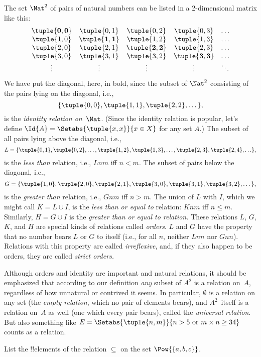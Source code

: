 \documentclass[../../../include/open-logic-section]{subfiles}
\begin{document}
\begin{ex}
The set $\Nat^{2}$ of
pairs of natural numbers can be listed in a 2-dimensional matrix like
this:
\[
\begin{array}{ccccc}
\mathbf{\tuple{ 0,0 }} & \tuple{ 0,1 } &
  \tuple{ 0,2 } & \tuple{ 0,3 } & \ldots\\
\tuple{ 1,0 } & \mathbf{\tuple{ 1,1 }} &
  \tuple{ 1,2 } & \tuple{ 1,3 } & \ldots\\
\tuple{ 2,0 } & \tuple{ 2,1 } &
  \mathbf{\tuple{ 2,2 }} & \tuple{ 2,3 } & \ldots\\
\tuple{ 3,0 } & \tuple{ 3,1 } & \tuple{ 3,2 } &
  \mathbf{\tuple{ 3,3 }} & \ldots\\
\vdots & \vdots & \vdots & \vdots & \mathbf{\ddots}
\end{array}
\]
We have put the diagonal, here, in bold, since the subset of $\Nat^2$ consisting of the pairs lying on the diagonal, i.e.,
\[
\{\tuple{0,0 }, \tuple{ 1,1 }, \tuple{ 2,2 }, \dots\},
\]
is the \emph{identity relation on}~$\Nat$. (Since the identity
relation is popular, let's define $\Id{A}=\Setabs{\tuple{ x,x }}{x \in
  X}$ for any set $A$.) The subset of all pairs lying above the
diagonal, i.e.,
\[
L = \{\tuple{ 0,1 },\tuple{ 0,2 },\ldots,\tuple{ 1,2 },
\tuple{ 1,3 }, \dots, \tuple{ 2,3 }, \tuple{ 2,4 },\ldots\},
\]
is the \emph{less than} relation, i.e., $Lnm$ iff $n<m$. The subset of
pairs below the diagonal, i.e.,
\[
G=\{ \tuple{ 1,0 },\tuple{ 2,0 },\tuple{
  2,1 }, \tuple{ 3,0 },\tuple{ 3,1 },\tuple{ 3,2 }, \dots\},
\]
is the \emph{greater than} relation, i.e., $Gnm$ iff $n>m$. The union
of $L$ with $I$, which we might call $K=L\cup I$, is the \emph{less than or equal to}
relation: $Knm$ iff $n \le m$. Similarly, $H=G \cup I$ is the
\emph{greater than or equal to relation.} These relations $L$, $G$, $K$, and $H$ are
special kinds of relations called \emph{orders}. $L$ and $G$ have the
property that no number bears $L$ or $G$ to itself (i.e., for all $n$,
neither $Lnn$ nor $Gnn$). Relations with this property are called
\emph{irreflexive}, and, if they also happen to be orders, they are
called \emph{strict orders.}
\end{ex}
\begin{explain}
Although orders and identity are important and natural relations, it
should be emphasized that according to our definition \emph{any}
subset of $A^{2}$ is a relation on~$A$, regardless of how unnatural or
contrived it seems. In particular, $\emptyset$ is a relation on any
set (the \emph{empty relation}, which no pair of elements bears), and
$A^{2}$~itself is a relation on~$A$ as well (one which every pair
bears), called the \emph{universal relation}. But also something like
$E=\Setabs{\tuple{n, m}}{n>5 \text{ or } m \times n \ge 34}$ counts as
a relation.
\end{explain}

\begin{prob}
List the !!{element}s of the relation $\subseteq$ on the set
$\Pow{\{a, b, c\}}$.
\end{prob}
\end{document}
